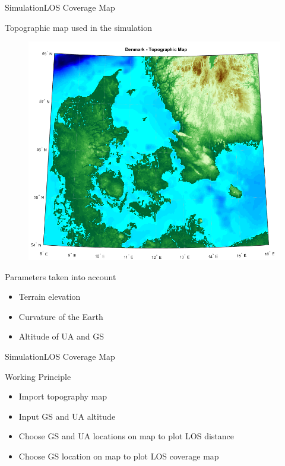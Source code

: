 
\begin{frame}{Simulation}{LOS Coverage Map}
  \begin{block}{Topographic map used in the simulation}
	\begin{figure}
    	\includegraphics[scale=0.26]{../report/figures/dk_map.png}
    \end{figure}
  \end{block}

  \begin{block}{Parameters taken into account}
	\begin{itemize}
	 	\item Terrain elevation
	  	\item Curvature of the Earth
	  	\item Altitude of UA and GS
	\end{itemize}
  \end{block}
\end{frame}

\begin{frame}{Simulation}{LOS Coverage Map}
  \begin{block}{Working Principle}
	  \begin{itemize}
	  	\item Import topography map
	  	\item Input GS and UA altitude
	  	\item Choose GS and UA locations on map to plot LOS distance
	  	\item Choose GS location on map to plot LOS coverage map
	  \end{itemize}
  \end{block}
\end{frame}

